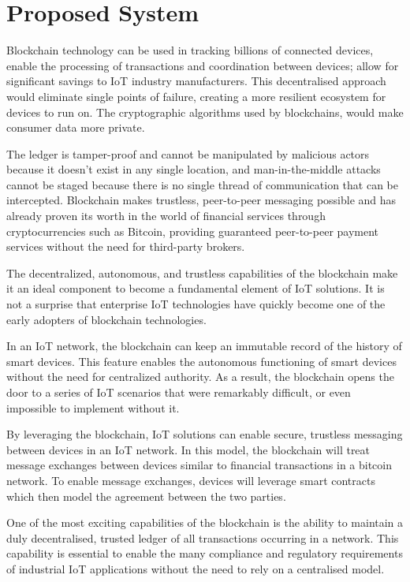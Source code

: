 \chapter{Proposed System}
Blockchain technology can be used in tracking billions of connected devices, enable the processing of transactions and coordination between devices; allow for significant savings to IoT industry manufacturers. This decentralised approach would eliminate single points of failure, creating a more resilient ecosystem for devices to run on. The cryptographic algorithms used by blockchains, would make consumer data more private.

The ledger is tamper-proof and cannot be manipulated by malicious actors because it doesn’t exist in any single location, and man-in-the-middle attacks cannot be staged because there is no single thread of communication that can be intercepted. Blockchain makes trustless, peer-to-peer messaging possible and has already proven its worth in the world of financial services through cryptocurrencies such as Bitcoin, providing guaranteed peer-to-peer payment services without the need for third-party brokers.

The decentralized, autonomous, and trustless capabilities of the blockchain make it an ideal component to become a fundamental element of IoT solutions. It is not a surprise that enterprise IoT technologies have quickly become one of the early adopters of blockchain technologies.

In an IoT network, the blockchain can keep an immutable record of the history of smart devices. This feature enables the autonomous functioning of smart devices without the need for centralized authority. As a result, the blockchain opens the door to a series of IoT scenarios that were remarkably difficult, or even impossible to implement without it.

By leveraging the blockchain, IoT solutions can enable secure, trustless messaging between devices in an IoT network. In this model, the blockchain will treat message exchanges between devices similar to financial transactions in a bitcoin network. To enable message exchanges, devices will leverage smart contracts which then model the agreement between the two parties.

One of the most exciting capabilities of the blockchain is the ability to maintain a duly decentralised, trusted ledger of all transactions occurring in a network. This capability is essential to enable the many compliance and regulatory requirements of industrial IoT applications without the need to rely on a centralised model.

